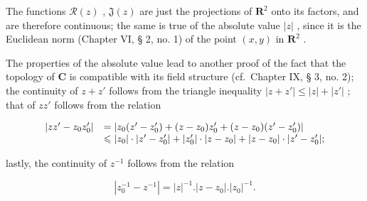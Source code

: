 The functions \(\mathcal{R}(z)\) , \(\mathfrak{J}(z)\) are just the projections of \(\mathbf{R}^2\) onto its factors, and are therefore continuous; the same is true of the absolute value \(|z|\) , since it is the Euclidean norm (Chapter VI, § 2, no. 1) of the point \((x,y)\) in \(\mathbf{R}^2\) .

The properties of the absolute value lead to another proof of the fact that the topology of \(\mathbf{C}\) is compatible with its field structure (cf.~Chapter IX, § 3, no. 2); the continuity of \(z + z'\) follows from the triangle inequality \(|z + z'| \leqslant |z| + |z'|\) ; that of \(zz'\) follows from the relation

\[
\begin{array}{r l} | z z ^ {\prime} - z _ {0} z _ {0} ^ {\prime} | & = | z _ {0} (z ^ {\prime} - z _ {0} ^ {\prime}) + (z - z _ {0}) z _ {0} ^ {\prime} + (z - z _ {0}) (z ^ {\prime} - z _ {0} ^ {\prime}) | \\ & \leqslant | z _ {0} | \cdot | z ^ {\prime} - z _ {0} ^ {\prime} | + | z _ {0} ^ {\prime} | \cdot | z - z _ {0} | + | z - z _ {0} | \cdot | z ^ {\prime} - z _ {0} ^ {\prime} |; \end{array}
\]

lastly, the continuity of \(z^{-1}\) follows from the relation

\[
\left| z _ {0} ^ {- 1} - z ^ {- 1} \right| = | z | ^ {- 1}. \left| z - z _ {0} \right|. \left| z _ {0} \right| ^ {- 1}.
\]

